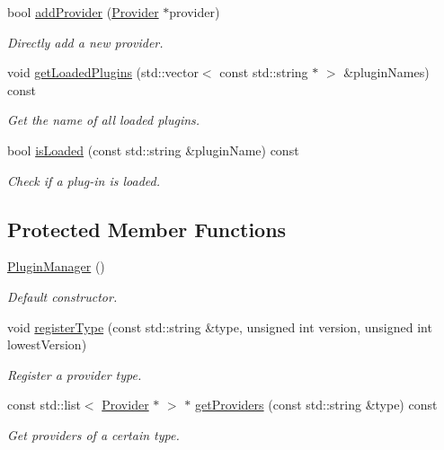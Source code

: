 \begin{DoxyCompactItemize}
bool \hyperlink{classpluma_1_1_plugin_manager_af27f8e89b8e29359495b6398464ebf02}{add\+Provider} (\hyperlink{classpluma_1_1_provider}{Provider} $\ast$provider)
\begin{DoxyCompactList}\small\item\em Directly add a new provider. \end{DoxyCompactList}\item 
void \hyperlink{classpluma_1_1_plugin_manager_a187e60d3fe7524774c08eb58ebcb843f}{get\+Loaded\+Plugins} (std\+::vector$<$ const std\+::string $\ast$ $>$ \&plugin\+Names) const 
\begin{DoxyCompactList}\small\item\em Get the name of all loaded plugins. \end{DoxyCompactList}\item 
bool \hyperlink{classpluma_1_1_plugin_manager_adbd75738cd4d8969608c9da8b58a03c3}{is\+Loaded} (const std\+::string \&plugin\+Name) const 
\begin{DoxyCompactList}\small\item\em Check if a plug-\/in is loaded. \end{DoxyCompactList}\end{DoxyCompactItemize}
\subsection*{Protected Member Functions}
\begin{DoxyCompactItemize}
\item 
\hyperlink{classpluma_1_1_plugin_manager_a8378a698812f8f079ff8aea7c1474d67}{Plugin\+Manager} ()
\begin{DoxyCompactList}\small\item\em Default constructor. \end{DoxyCompactList}\item 
void \hyperlink{classpluma_1_1_plugin_manager_ab70b5b6b719bdbd64c27ae2dcb12a64d}{register\+Type} (const std\+::string \&type, unsigned int version, unsigned int lowest\+Version)
\begin{DoxyCompactList}\small\item\em Register a provider type. \end{DoxyCompactList}\item 
const std\+::list$<$ \hyperlink{classpluma_1_1_provider}{Provider} $\ast$ $>$ $\ast$ \hyperlink{classpluma_1_1_plugin_manager_ad5eab1dcae10122fdfb8d94d7b391e9e}{get\+Providers} (const std\+::string \&type) const 
\begin{DoxyCompactList}\small\item\em Get providers of a certain type. \end{DoxyCompactList}\end{DoxyCompactItemize}



